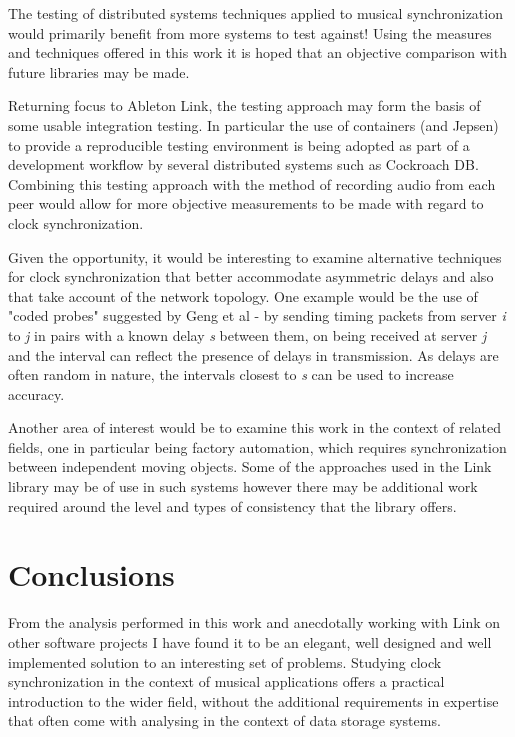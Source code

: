 \documentclass[11pt]{article} %
\theoremstyle{plain}
\theoremstyle{definition}
\begin{document}
The testing of distributed systems techniques applied to musical
synchronization would primarily benefit from more systems to test against!
Using the measures and techniques offered in this work it is hoped that an
objective comparison with future libraries may be made.

Returning focus to Ableton Link, the testing approach may form the basis of
some usable integration testing. In particular the use of containers (and
Jepsen) to provide a reproducible testing environment is being adopted as part
of a development workflow by several distributed systems such as Cockroach
DB\cite{cockroach}. Combining this testing approach with the method of
recording audio from each peer would allow for more objective measurements to
be made with regard to clock synchronization.

Given the opportunity, it would be interesting to examine alternative
techniques for clock synchronization that better accommodate asymmetric delays
and also that take account of the network topology. One example would be the
use of "coded probes" suggested by Geng et al\cite{geng2018} - by sending
timing packets from server \textit{i} to \textit{j} in pairs with a known delay
\textit{s} between them, on being received at server \textit{j} and the
interval can reflect the presence of delays in transmission. As delays are
often random in nature, the intervals closest to \textit{s} can be used to
increase accuracy.

Another area of interest would be to examine this work in the context of
related fields, one in particular being factory automation, which requires
synchronization between independent moving objects. Some of the approaches used
in the Link library may be of use in such systems however there may be
additional work required around the level and types of consistency that the
library offers.

\section{Conclusions}

From the analysis performed in this work and anecdotally working with Link on
other software projects I have found it to be an elegant, well designed and
well implemented solution to an interesting set of problems. Studying clock
synchronization in the context of musical applications offers a practical
introduction to the wider field, without the additional requirements in
expertise that often come with analysing in the context of data storage
systems.
\end{document}

